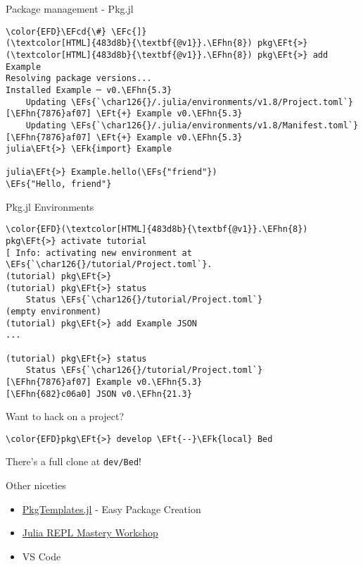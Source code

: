\documentclass[bigger]{beamer}
\newcommand{\EFc}[1]{\textcolor{EFc}{#1}} %
\newcommand{\EFcd}[1]{\textcolor{EFcd}{#1}} %
\newcommand{\EFs}[1]{\textcolor{EFs}{#1}} %
\newcommand{\EFk}[1]{\textcolor{EFk}{#1}} %
\newcommand{\EFt}[1]{\textcolor{EFt}{#1}} %
\newcommand{\EFhn}[1]{\textcolor{EFhn}{\textbf{#1}}} %
\begin{document}
\begin{frame}[label={sec:org08fe72a},fragile]{Package management - Pkg.jl}
 \begin{Code}
\begin{Verbatim}
\color{EFD}\EFcd{\#} \EFc{]}
(\textcolor[HTML]{483d8b}{\textbf{@v1}}.\EFhn{8}) pkg\EFt{>}
(\textcolor[HTML]{483d8b}{\textbf{@v1}}.\EFhn{8}) pkg\EFt{>} add Example
Resolving package versions...
Installed Example ─ v0.\EFhn{5.3}
    Updating \EFs{`\char126{}/.julia/environments/v1.8/Project.toml`}
[\EFhn{7876}af07] \EFt{+} Example v0.\EFhn{5.3}
    Updating \EFs{`\char126{}/.julia/environments/v1.8/Manifest.toml`}
[\EFhn{7876}af07] \EFt{+} Example v0.\EFhn{5.3}
julia\EFt{>} \EFk{import} Example

julia\EFt{>} Example.hello(\EFs{"friend"})
\EFs{"Hello, friend"}
\end{Verbatim}
\end{Code}
\end{frame}
\begin{frame}[label={sec:orgbbe8699},fragile]{Pkg.jl Environments}
 \begin{Code}
\begin{Verbatim}
\color{EFD}(\textcolor[HTML]{483d8b}{\textbf{@v1}}.\EFhn{8}) pkg\EFt{>} activate tutorial
[ Info: activating new environment at \EFs{`\char126{}/tutorial/Project.toml`}.
(tutorial) pkg\EFt{>}
(tutorial) pkg\EFt{>} status
    Status \EFs{`\char126{}/tutorial/Project.toml`}
(empty environment)
(tutorial) pkg\EFt{>} add Example JSON
...

(tutorial) pkg\EFt{>} status
    Status \EFs{`\char126{}/tutorial/Project.toml`}
[\EFhn{7876}af07] Example v0.\EFhn{5.3}
[\EFhn{682}c06a0] JSON v0.\EFhn{21.3}
\end{Verbatim}
\end{Code}
\end{frame}

\begin{frame}[label={sec:orgfbc2e64},fragile]{Want to hack on a project?}
 \begin{Code}
\begin{Verbatim}
\color{EFD}pkg\EFt{>} develop \EFt{--}\EFk{local} Bed
\end{Verbatim}
\end{Code}

There's a full clone at \texttt{dev/Bed}!
\end{frame}

\begin{frame}[label={sec:org70206bc}]{Other niceties}
\begin{itemize}
\item \href{https://github.com/JuliaCI/PkgTemplates.jl}{PkgTemplates.jl} - Easy Package Creation
\item \href{https://www.youtube.com/live/bHLXEUt5KLc?feature=share}{Julia REPL Mastery Workshop}
\item VS Code
\end{itemize}
\end{frame}
\end{document}

